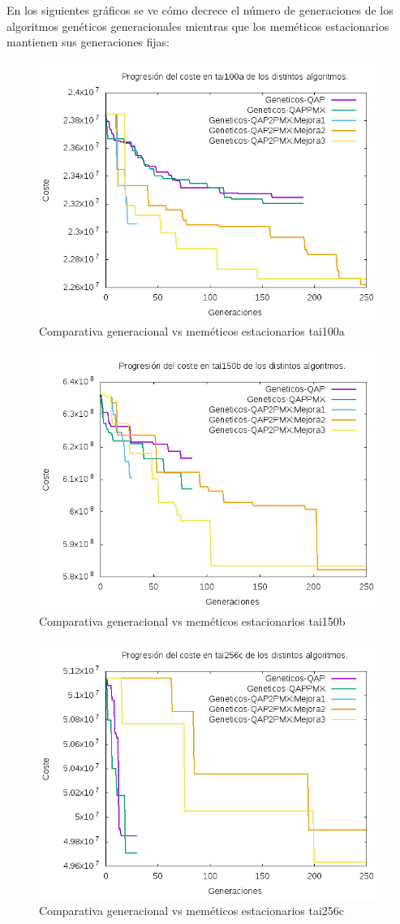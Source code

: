 En los siguientes gráficos se ve cómo decrece el número de generaciones de los algoritmos genéticos generacionales mientras que los meméticos estacionarios mantienen sus generaciones fijas:\\

\begin{figure}[H]
	\centering
	\includegraphics[width=0.7\linewidth]{graficos/comparativaGeneracionaltai100a}
	\caption{Comparativa generacional vs meméticos estacionarios tai100a}
	\label{fig:comparativaGeneracionaltai100a}
\end{figure}
 
\begin{figure}[H]
\centering
\includegraphics[width=0.7\linewidth]{graficos/comparativaGeneracionaltai150b}
\caption{Comparativa generacional vs meméticos estacionarios tai150b}
\label{fig:comparativaGeneracionaltai150b}
\end{figure}

\begin{figure}[H]
\centering
\includegraphics[width=0.7\linewidth]{graficos/comparativaGeneracionaltai256c}
\caption{Comparativa generacional vs meméticos estacionarios tai256c}
\label{fig:comparativaGeneracionaltai256c}
\end{figure}

